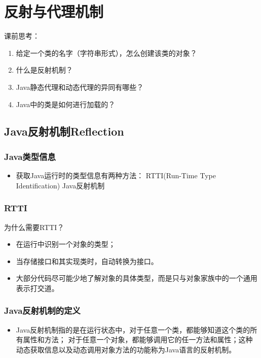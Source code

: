 \chapter{反射与代理机制}
课前思考：
\begin{enumerate}
	\item 给定一个类的名字（字符串形式），怎么创建该类的对象？
	\item 什么是反射机制？
	\item Java静态代理和动态代理的异同有哪些？
	\item Java中的类是如何进行加载的？
\end{enumerate}
\section{Java反射机制Reflection}
\subsection{Java类型信息}
\begin{itemize}
	\item 获取Java运行时的类型信息有两种方法：
	\subitem RTTI(Run-Time Type Identification)
	\subitem Java反射机制
\end{itemize}
\subsection{RTTI}
\noindent 为什么需要RTTI？
\begin{itemize}
	\item 在运行中识别一个对象的类型；
	\item 当存储接口和其实现类时，自动转换为接口。
	\item 大部分代码尽可能少地了解对象的具体类型，而是只与对象家族中的一个通用表示打交道。
\end{itemize}
\subsection{Java反射机制的定义}
\begin{itemize}
	\item Java反射机制指的是在运行状态中，对于任意一个类，都能够知道这个类的所有属性和方法；
	对于任意一个对象，都能够调用它的任一方法和属性；这种动态获取信息以及动态调用对象方法的功能称为Java语言的反射机制。
\end{itemize}
